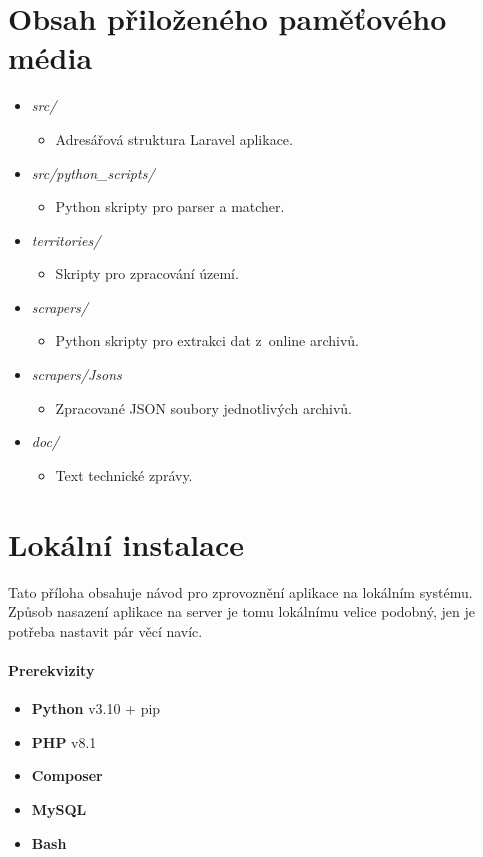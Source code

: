 \chapter{Obsah přiloženého paměťového média}
\begin{itemize}
	\item \emph{src/}
	\begin{itemize}
		\item Adresářová struktura Laravel aplikace.
	\end{itemize}
	\item \emph{src/python\_scripts/}
	\begin{itemize}
		\item Python skripty pro parser a matcher.
	\end{itemize}
	\item \emph{territories/}
	\begin{itemize}
		\item Skripty pro zpracování území.
	\end{itemize}
	\item \emph{scrapers/}
	\begin{itemize}
		\item Python skripty pro extrakci dat z~online archivů.
	\end{itemize}
	\item \emph{scrapers/Jsons}
	\begin{itemize}
		\item Zpracované JSON soubory jednotlivých archivů.
	\end{itemize}
	\item \emph{doc/}
	\begin{itemize}
		\item Text technické zprávy.
	\end{itemize}
\end{itemize}

\chapter{Lokální instalace}
Tato příloha obsahuje návod pro zprovoznění aplikace na lokálním systému. Způsob nasazení aplikace na server je tomu lokálnímu velice podobný, jen je potřeba nastavit pár věcí navíc.

\subsubsection{Prerekvizity}
\begin{itemize}
	\item \textbf{Python} v3.10 + pip
	\item \textbf{PHP} v8.1
	\item \textbf{Composer}
	\item \textbf{MySQL}
	\item \textbf{Bash}
\end{itemize}


